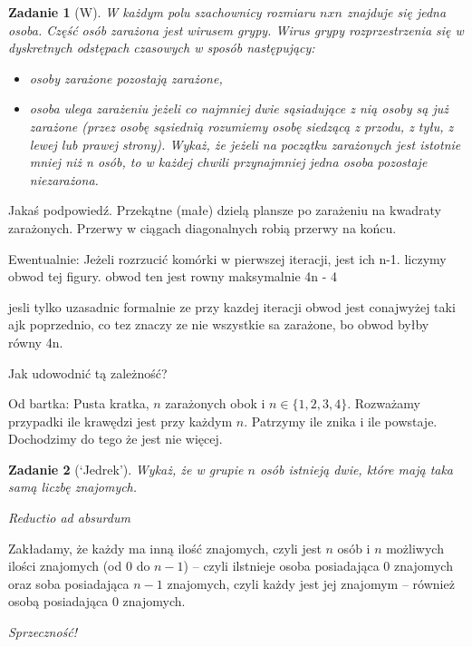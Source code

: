 \documentclass{mwbk}
\newtheorem{zad}{Zadanie}[chapter]
\begin{document}
\begin{zad}[W]
    W każdym polu szachownicy rozmiaru $n x n $ znajduje się jedna osoba.
    Część osób zarażona jest wirusem grypy. Wirus grypy rozprzestrzenia się w dyskretnych
    odstępach czasowych w sposób następujący:
    \begin{itemize}
        \item osoby zarażone pozostają zarażone,
        \item osoba ulega zarażeniu jeżeli co najmniej dwie sąsiadujące z nią osoby są już zarażone
              (przez osobę sąsiednią rozumiemy osobę siedzącą z przodu, z tyłu, z lewej lub prawej
              strony).
              Wykaż, że jeżeli na początku zarażonych jest istotnie mniej niż n osób, to w każdej chwili
              przynajmniej jedna osoba pozostaje niezarażona.
    \end{itemize}
\end{zad}
\begin{mdframed}
    Jakaś podpowiedź. Przekątne (małe) dzielą plansze po zarażeniu
    na kwadraty zarażonych. Przerwy w ciągach diagonalnych robią przerwy na końcu.

    Ewentualnie:
    Jeżeli rozrzucić komórki w pierwszej iteracji, jest ich n-1. liczymy obwod
    tej figury. obwod ten jest rowny maksymalnie 4n - 4

    jesli tylko uzasadnic formalnie ze przy kazdej iteracji obwod
    jest conajwyżej taki ajk poprzednio, co tez znaczy ze nie
    wszystkie sa zarażone, bo obwod byłby równy 4n.

    Jak udowodnić tą zależność?

    Od bartka:
    Pusta kratka, $n$ zarażonych obok i $n \in \{1, 2, 3, 4\}$.
    Rozważamy przypadki ile krawędzi jest przy każdym $n$.
    Patrzymy ile znika i ile powstaje. Dochodzimy do tego że jest
    nie więcej.
\end{mdframed}






\begin{zad}[`Jedrek']
    Wykaż, że w grupie $n$ osób istnieją dwie, które mają taka samą liczbę znajomych.
\end{zad}
\begin{mdframed}
    \textit{Reductio ad absurdum}

    Zakładamy, że każdy ma inną ilość znajomych, czyli jest $n$ osób
    i $n$ możliwych ilości znajomych (od $0$ do $n-1$) -- czyli ilstnieje osoba
    posiadająca $0$ znajomych oraz soba posiadająca $n-1$ znajomych, czyli każdy
    jest jej znajomym -- również osobą posiadająca $0$ znajomych.

    \textit{Sprzeczność!}
\end{mdframed}
\end{document}
